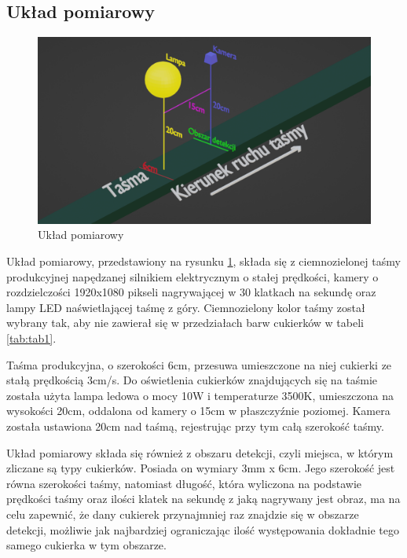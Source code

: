 \documentclass{article}
\begin{document}
\subsection{Układ pomiarowy}
\label{Układ pomiarowy}

\begin{figure}[H]
    \centering
    \includegraphics[width=\linewidth]{ukladPomiarowy.png}
    \caption{Układ pomiarowy}
    \label{fig:ukladPomiarowy}
\end{figure}

Układ pomiarowy, przedstawiony na rysunku \ref{fig:ukladPomiarowy}, składa się z ciemnozielonej taśmy produkcyjnej napędzanej silnikiem elektrycznym o stałej prędkości, kamery o rozdzielczości 1920x1080 pikseli nagrywającej w 30 klatkach na sekundę oraz lampy LED naświetlającej taśmę z góry. Ciemnozielony kolor taśmy został wybrany tak, aby nie zawierał się w przedziałach barw cukierków w tabeli \ref{tab:tab1}.

Taśma produkcyjna, o szerokości 6cm, przesuwa umieszczone na niej cukierki ze stałą prędkością 3cm/s. Do oświetlenia cukierków znajdujących się na taśmie została użyta lampa ledowa o mocy 10W i temperaturze 3500K, umieszczona na wysokości 20cm, oddalona od kamery o 15cm w płaszczyźnie poziomej. Kamera została ustawiona 20cm nad taśmą, rejestrując przy tym całą szerokość taśmy.

Układ pomiarowy składa się również z obszaru detekcji, czyli miejsca, w którym zliczane są typy cukierków. Posiada on wymiary 3mm x 6cm. Jego szerokość jest równa szerokości taśmy, natomiast długość, która wyliczona na podstawie prędkości taśmy oraz ilości klatek na sekundę z jaką nagrywany jest obraz, ma na celu zapewnić, że dany cukierek przynajmniej raz znajdzie się w obszarze detekcji, możliwie jak najbardziej ograniczając ilość występowania dokładnie tego samego cukierka w tym obszarze.
\end{document}
